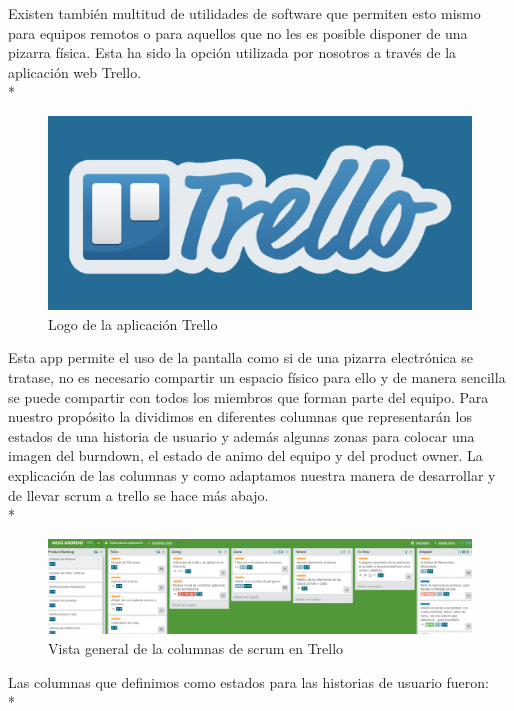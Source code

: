 \documentclass[../pfc.tex]{subfiles}
\begin{document}
	Existen también multitud de utilidades de software que permiten esto mismo para equipos remotos o para aquellos que no les es posible disponer de una pizarra física. Esta ha sido la opción utilizada por nosotros a través de la aplicación web Trello.\\*
	
	\begin{figure}[H]
		\centering
		\includegraphics[width=0.5\linewidth]{../images/TrelloLogo}
		\caption{Logo de la aplicación Trello}
		\label{fig:trello}
	\end{figure}
	
	Esta app permite el uso de la pantalla como si de una pizarra electrónica se tratase, no es necesario compartir un espacio físico para ello y de manera sencilla se puede compartir con todos los miembros que forman parte del equipo. Para nuestro propósito la dividimos en diferentes columnas que representarán los estados de una historia de usuario y además algunas zonas para colocar una imagen del burndown, el estado de animo del equipo y del product owner. La explicación de las columnas y como adaptamos nuestra manera de desarrollar y de llevar scrum a trello se hace más abajo.\\*
	
	\begin{figure}[H]
		\centering
		\includegraphics[width=1\linewidth]{../images/trellocomphorizontal}
		\caption{Vista general de la columnas de scrum en Trello}
		\label{fig:trelloComp}
	\end{figure}
	
	Las columnas que definimos como estados para las historias de usuario fueron:\\*
	
\end{document}
